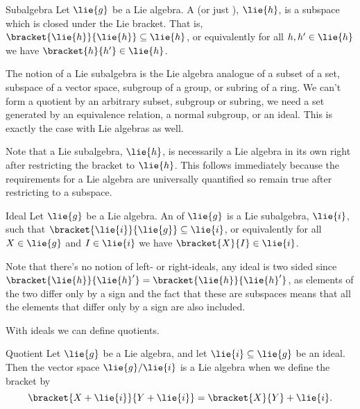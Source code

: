 \documentclass[fleqn]{NotesClass}
\begin{document}
    \begin{dfn}{Subalgebra}{}
        Let \(\lie{g}\) be a Lie algebra.
        A  (or just ), \(\lie{h}\), is a subspace which is closed under the Lie bracket.
        That is, \(\bracket{\lie{h}}{\lie{h}} \subseteq \lie{h}\), or equivalently for all \(h, h' \in \lie{h}\) we have \(\bracket{h}{h'} \in \lie{h}\).
    \end{dfn}
    
    The notion of a Lie subalgebra is the Lie algebra analogue of a subset of a set, subspace of a vector space, subgroup of a group, or subring of a ring.
    We can't form a quotient by an arbitrary subset, subgroup or subring, we need a set generated by an equivalence relation, a normal subgroup, or an ideal.
    This is exactly the case with Lie algebras as well.
    
    Note that a Lie subalgebra, \(\lie{h}\), is necessarily a Lie algebra in its own right after restricting the bracket to \(\lie{h}\).
    This follows immediately because the requirements for a Lie algebra are universally quantified so remain true after restricting to a subspace.
    
    \begin{dfn}{Ideal}{}
        Let \(\lie{g}\) be a Lie algebra.
        An  of \(\lie{g}\) is a Lie subalgebra, \(\lie{i}\), such that \(\bracket{\lie{i}}{\lie{g}} \subseteq \lie{i}\), or equivalently for all \(X \in \lie{g}\) and \(I \in \lie{i}\) we have \(\bracket{X}{I} \in \lie{i}\).
    \end{dfn}
    
    Note that there's no notion of left- or right-ideals, any ideal is two sided since \(\bracket{\lie{h}}{\lie{h}'} = \bracket{\lie{h}}{\lie{h}'}\), as elements of the two differ only by a sign and the fact that these are subspaces means that all the elements that differ only by a sign are also included.
    
    With ideals we can define quotients.
    
    \begin{dfn}{Quotient}{}
        Let \(\lie{g}\) be a Lie algebra, and let \(\lie{i} \subseteq \lie{g}\) be an ideal.
        Then the  vector space \(\lie{g}/\lie{i}\) is a Lie algebra when we define the bracket by
        \begin{equation}
            \bracket{X + \lie{i}}{Y + \lie{i}} = \bracket{X}{Y} + \lie{i}.
        \end{equation}
    \end{dfn}
    
\end{document}
